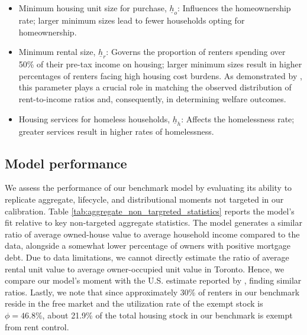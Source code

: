 \documentclass[parskip=full]{article}
\begin{document}
\begin{itemize}
    \item Minimum housing unit size for purchase, $\underline{h}_{o}$: Influences the homeownership rate; larger minimum sizes lead to fewer households opting for homeownership.
    \item Minimum rental size, $\underline{h}_{r}$: Governs the proportion of renters spending over 50\% of their pre-tax income on housing; larger minimum sizes result in higher percentages of renters facing high housing cost burdens. As demonstrated by \citet{rs-2023}, this parameter plays a crucial role in matching the observed distribution of rent-to-income ratios and, consequently, in determining welfare outcomes.
    \item Housing services for homeless households, $\underline{h}_{h}$: Affects the homelessness rate; greater services result in higher rates of homelessness.
\end{itemize}

\subsection{Model performance}\label{sec:non_targeted_statistics}

We assess the performance of our benchmark model by evaluating its ability to replicate aggregate, lifecycle, and distributional moments not targeted in our calibration. Table \ref{tab:aggregate_non_targreted_statistics} reports the model's fit relative to key non-targeted aggregate statistics. The model generates a similar ratio of average owned-house value to average household income compared to the data, alongside a somewhat lower percentage of owners with positive mortgage debt. Due to data limitations, we cannot directly estimate the ratio of average rental unit value to average owner-occupied unit value in Toronto. Hence, we compare our model's moment with the U.S. estimate reported by \citet{chatterjee-eyigungor-2015}, finding similar ratios. Lastly, we note that since approximately 30\% of renters in our benchmark reside in the free market and the utilization rate of the exempt stock is $\phi=46.8\%$, about 21.9\% of the total housing stock in our benchmark is exempt from rent control.

\end{document}
